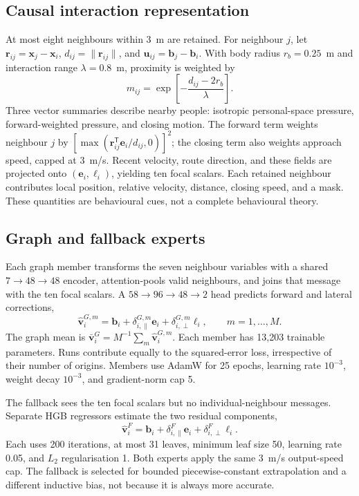 \documentclass[preprint,11pt,authoryear]{elsarticle}
\begin{document}
\subsection{Causal interaction representation}
At most eight neighbours within 3~m are retained. For neighbour $j$, let $\mathbf r_{ij}=\mathbf x_j-\mathbf x_i$, $d_{ij}=\|\mathbf r_{ij}\|$, and $\mathbf u_{ij}=\mathbf b_j-\mathbf b_i$. With body radius $r_b=0.25$~m and interaction range $\lambda=0.8$~m, proximity is weighted by
\begin{equation}
m_{ij}=\exp\!\left[-\frac{d_{ij}-2r_b}{\lambda}\right].
\end{equation}
Three vector summaries describe nearby people: isotropic personal-space pressure, forward-weighted pressure, and closing motion. The forward term weights neighbour $j$ by $[\max(\mathbf r_{ij}^{\mathsf T}\mathbf e_i/d_{ij},0)]^2$; the closing term also weights approach speed, capped at 3~m/s. Recent velocity, route direction, and these fields are projected onto $(\mathbf e_i,\boldsymbol\ell_i)$, yielding ten focal scalars. Each retained neighbour contributes local position, relative velocity, distance, closing speed, and a mask. These quantities are behavioural cues, not a complete behavioural theory.

\subsection{Graph and fallback experts}
Each graph member transforms the seven neighbour variables with a shared $7\!\rightarrow\!48\!\rightarrow\!48$ encoder, attention-pools valid neighbours, and joins that message with the ten focal scalars. A $58\!\rightarrow\!96\!\rightarrow\!48\!\rightarrow\!2$ head predicts forward and lateral corrections,
\begin{equation}
\label{eq:graph}
\widehat{\mathbf v}^{G,m}_i=\mathbf b_i+\delta^{G,m}_{i,\parallel}\mathbf e_i+\delta^{G,m}_{i,\perp}\boldsymbol\ell_i,
\qquad m=1,\ldots,M.
\end{equation}
The graph mean is $\bar{\mathbf v}^{G}_i=M^{-1}\sum_m\widehat{\mathbf v}^{G,m}_i$. Each member has 13,203 trainable parameters. Runs contribute equally to the squared-error loss, irrespective of their number of origins. Members use AdamW for 25 epochs, learning rate $10^{-3}$, weight decay $10^{-3}$, and gradient-norm cap 5.

The fallback sees the ten focal scalars but no individual-neighbour messages. Separate HGB regressors estimate the two residual components,
\begin{equation}
\label{eq:fallback}
\widehat{\mathbf v}^{F}_i=\mathbf b_i+\delta^{F}_{i,\parallel}\mathbf e_i+\delta^{F}_{i,\perp}\boldsymbol\ell_i.
\end{equation}
Each uses 200 iterations, at most 31 leaves, minimum leaf size 50, learning rate 0.05, and $L_2$ regularisation 1. Both experts apply the same 3~m/s output-speed cap. The fallback is selected for bounded piecewise-constant extrapolation and a different inductive bias, not because it is always more accurate.
\end{document}
